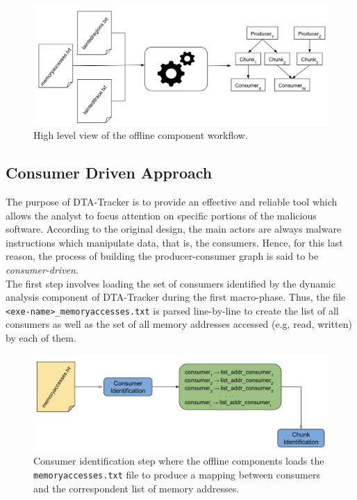 \documentclass[LaM,binding=0.6cm]{sapthesis}
\begin{document}
\begin{figure}[h!]
\centering
\vspace{-5mm}
\includegraphics[scale=.43]{images/dtatracker3}
\vspace{-2mm}
\caption{High level view of the offline component workflow.}
\vspace{-4mm}
\end{figure}

\subsection{Consumer Driven Approach}
The purpose of DTA-Tracker is to provide an effective and reliable tool which allows the analyst to focus attention on specific portions of the malicious software. According to the original design, the main actors are always malware instructions which manipulate data, that is, the consumers. Hence, for this last reason, the process of building the producer-consumer graph is said to be \textit{consumer-driven}.\\

The first step involves loading the set of consumers identified by the dynamic analysis component of DTA-Tracker during the first macro-phase. Thus, the file \texttt{<exe-name>\_memoryaccesses.txt} is parsed line-by-line to create the list of all consumers as well as the set of all memory addresses accessed (e.g, read, written) by each of them.

\begin{figure}[h!]
\centering
\vspace{-1mm}
\includegraphics[scale=.48]{images/dtatracker4}
\vspace{-3mm}
\caption{Consumer identification step where the offline components loads the \texttt{memoryaccesses.txt} file to produce a mapping between consumers and the correspondent list of memory addresses.}
\vspace{-1mm}
\end{figure}
\end{document}
